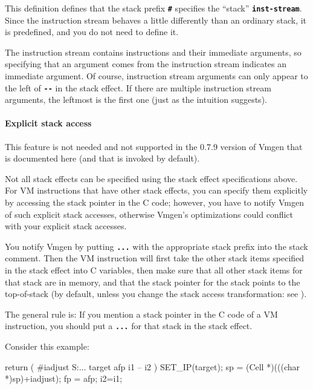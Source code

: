 \documentclass[10pt,english]{article}
\begin{document}
This definition defines that the stack prefix \texttt{\textbf{\#}}
specifies the \textquotedblleft{}stack\textquotedblright{} \texttt{\textbf{inst-stream}}.
Since the instruction stream behaves a little differently than an
ordinary stack, it is predefined, and you do not need to define it.

The instruction stream contains instructions and their immediate arguments,
so specifying that an argument comes from the instruction stream indicates
an immediate argument. Of course, instruction stream arguments can
only appear to the left of \texttt{\textbf{-{}-}} in the stack effect.
If there are multiple instruction stream arguments, the leftmost is
the first one (just as the intuition suggests).


\paragraph{Explicit stack access}

This feature is not needed and not supported in the 0.7.9 version
of Vmgen that is documented here (and that is invoked by default).

Not all stack effects can be specified using the stack effect specifications
above. For VM instructions that have other stack effects, you can
specify them explicitly by accessing the stack pointer in the C code;
however, you have to notify Vmgen of such explicit stack accesses,
otherwise Vmgen's optimizations could conflict with your explicit
stack accesses.

You notify Vmgen by putting \texttt{\textbf{...}} with the appropriate
stack prefix into the stack comment. Then the VM instruction will
first take the other stack items specified in the stack effect into
C variables, then make sure that all other stack items for that stack
are in memory, and that the stack pointer for the stack points to
the top-of-stack (by default, unless you change the stack access transformation:
see ).

The general rule is: If you mention a stack pointer in the C code
of a VM instruction, you should put a \texttt{\textbf{...}} for that
stack in the stack effect.

Consider this example:

\nwenddocs{}\endmoddef
return ( #iadjust S:... target afp i1 -- i2 )
SET_IP(target);
sp = (Cell *)(((char *)sp)+iadjust);
fp = afp;
i2=i1;
\nwendcode{}\nwdocspar
\end{document}
